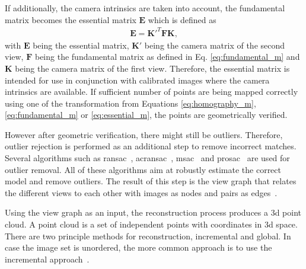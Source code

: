 If additionally, the camera intrinsics are taken into account, the fundamental matrix becomes the essential matrix $\textbf{E}$ which is defined as
\begin{align}
    \textbf{E} = \textbf{K}'^{T}\textbf{F}\textbf{K}, \label{eq:essential_m}
\end{align}
with $\textbf{E}$ being the essential matrix, $\textbf{K}'$ being the camera matrix of the second view, $\textbf{F}$ being the fundamental matrix as defined in Eq. \ref{eq:fundamental_m} and $\textbf{K}$ being the camera matrix of the first view. Therefore, the essential matrix is intended for use in conjunction with calibrated images where the camera intrinsics are available.
If sufficient number of points are being mapped correctly using one of the transformation from Equations \ref{eq:homography_m}, \ref{eq:fundamental_m} or \ref{eq:essential_m}, the points are geometrically verified.

However after geometric verification, there might still be outliers. Therefore, outlier rejection is performed as an additional step to remove incorrect matches. Several algorithms such as \gls{ransac}~\cite{Fischler1981RandomCartography}, \gls{acransac}~\cite{moisan2012automatic}, \gls{msac}~\cite{wang2009generalized} and \gls{prosac}~\cite{Chum2005MatchingConsensus} are used for outlier removal. All of these algorithms aim at robustly estimate the correct model and remove outliers. The result of this step is the view graph that relates the different views to each other with images as nodes and pairs as edges~\cite{schonberger2016structure}.

Using the view graph as an input, the reconstruction process produces a \gls{3d} point cloud. A point cloud is a set of independent points with coordinates in \gls{3d} space. There are two principle methods for reconstruction, incremental and global. In case the image set is unordered, the more common approach is to use the incremental approach~\cite{schonberger2016structure}.

